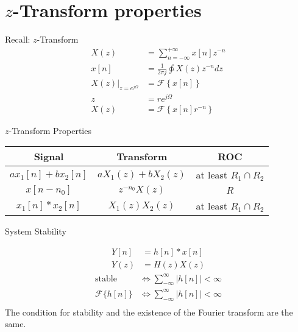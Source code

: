 \section{$z$-Transform properties}
\begin{frame}{Recall: $z$-Transform}
    \begin{align*}
        X(z) &= \sum_{n=-\infty}^{+\infty}x[n]z^{-n}\\
        x[n] &= \frac{1}{2\pi j}\ointctrclockwise X(z)z^{-n}dz\\
        \left.X(z)\right|_{z=e^{j\Omega}} &= \mathcal{F}\left\{x[n]\right\}\\
        z &= re^{j\Omega}\\
        X(z) &= \mathcal{F}\left\{x[n]r^{-n}\right\}
    \end{align*}
\end{frame}

\begin{frame}{$z$-Transform Properties}
    \begin{center}
        \begin{tabular}{ccc}
            \hline
            Signal & Transform & ROC\\
            \hline
            $ax_1[n] + bx_2[n]$ & $aX_1(z) + bX_2(z)$ & at least $R_1 \cap R_2$\\
            $x[n-n_0]$ & $z^{-n_0}X(z)$ & $R$\\
            $x_1[n]\ast x_2[n]$ & $X_1(z)X_2(z)$ & at least $R_1 \cap R_2$\\
            \hline
        \end{tabular}
    \end{center}

\end{frame}

\begin{frame}{System Stability}
    \begin{center}
        
    \end{center}
    \begin{align*}
        Y[n] &= h[n]\ast x[n]\\
        Y(z) &= H(z)X(z)
    \end{align*}
    \pause
    \begin{align*}
        \text{stable} &\Leftrightarrow \sum_{-\infty}^{\infty} |h[n]| < \infty\\
        \mathcal{F}\{h[n]\}&\Leftrightarrow \sum_{-\infty}^{\infty} |h[n]| < \infty\\
    \end{align*}
    \pause
    The condition for stability and the existence of the Fourier transform are the same.
\end{frame}


